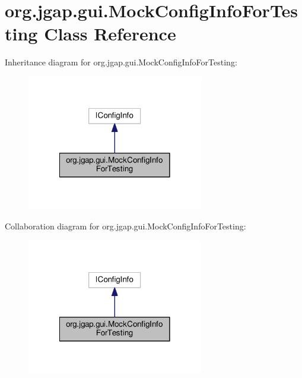 \hypertarget{classorg_1_1jgap_1_1gui_1_1_mock_config_info_for_testing}{\section{org.\-jgap.\-gui.\-Mock\-Config\-Info\-For\-Testing Class Reference}
\label{classorg_1_1jgap_1_1gui_1_1_mock_config_info_for_testing}
}


Inheritance diagram for org.\-jgap.\-gui.\-Mock\-Config\-Info\-For\-Testing\-:
\nopagebreak
\begin{figure}[H]
\begin{center}
\leavevmode
\includegraphics[width=218pt]{classorg_1_1jgap_1_1gui_1_1_mock_config_info_for_testing__inherit__graph}
\end{center}
\end{figure}


Collaboration diagram for org.\-jgap.\-gui.\-Mock\-Config\-Info\-For\-Testing\-:
\nopagebreak
\begin{figure}[H]
\begin{center}
\leavevmode
\includegraphics[width=218pt]{classorg_1_1jgap_1_1gui_1_1_mock_config_info_for_testing__coll__graph}
\end{center}
\end{figure}
